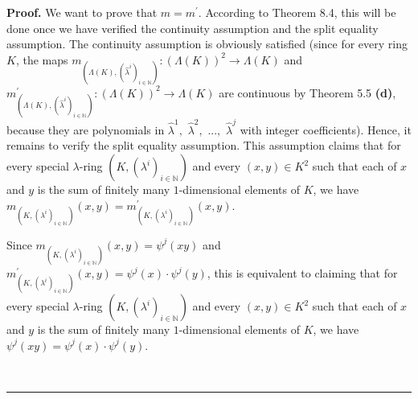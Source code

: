\documentclass[numbers=enddot,12pt,final,onecolumn,notitlepage]{scrartcl}%
\newenvironment{proof}[1][Proof]{\noindent\textbf{#1.} }{\ \rule{0.5em}{0.5em}}
\begin{document}
\begin{proof}
We want to prove that $m=m^{\prime}$. According to Theorem 8.4, this will be
done once we have verified the continuity assumption and the split equality
assumption. The continuity assumption is obviously satisfied (since for every
ring $K$, the maps $m_{\left(  \Lambda\left(  K\right)  ,\left(
\widehat{\lambda}^{i}\right)  _{i\in\mathbb{N}}\right)  }:\left(
\Lambda\left(  K\right)  \right)  ^{2}\rightarrow\Lambda\left(  K\right)  $
and $m_{\left(  \Lambda\left(  K\right)  ,\left(  \widehat{\lambda}%
^{i}\right)  _{i\in\mathbb{N}}\right)  }^{\prime}:\left(  \Lambda\left(
K\right)  \right)  ^{2}\rightarrow\Lambda\left(  K\right)  $ are continuous by
Theorem 5.5 \textbf{(d)}, because they are polynomials in $\widehat{\lambda
}^{1},$ $\widehat{\lambda}^{2},$ $...,$ $\widehat{\lambda}^{j}$ with integer
coefficients). Hence, it remains to verify the split equality assumption. This
assumption claims that for every special $\lambda$-ring $\left(  K,\left(
\lambda^{i}\right)  _{i\in\mathbb{N}}\right)  $ and every $\left(  x,y\right)
\in K^{2}$ such that each of $x$ and $y$ is the sum of finitely many
$1$-dimensional elements of $K$, we have $m_{\left(  K,\left(  \lambda
^{i}\right)  _{i\in\mathbb{N}}\right)  }\left(  x,y\right)  =m_{\left(
K,\left(  \lambda^{i}\right)  _{i\in\mathbb{N}}\right)  }^{\prime}\left(
x,y\right)  $.

Since $m_{\left(  K,\left(  \lambda^{i}\right)  _{i\in\mathbb{N}}\right)
}\left(  x,y\right)  =\psi^{j}\left(  xy\right)  $ and $m_{\left(  K,\left(
\lambda^{i}\right)  _{i\in\mathbb{N}}\right)  }^{\prime}\left(  x,y\right)
=\psi^{j}\left(  x\right)  \cdot\psi^{j}\left(  y\right)  $, this is
equivalent to claiming that for every special $\lambda$-ring $\left(
K,\left(  \lambda^{i}\right)  _{i\in\mathbb{N}}\right)  $ and every $\left(
x,y\right)  \in K^{2}$ such that each of $x$ and $y$ is the sum of finitely
many $1$-dimensional elements of $K$, we have $\psi^{j}\left(  xy\right)
=\psi^{j}\left(  x\right)  \cdot\psi^{j}\left(  y\right)  $.


\end{proof}
\end{document}
